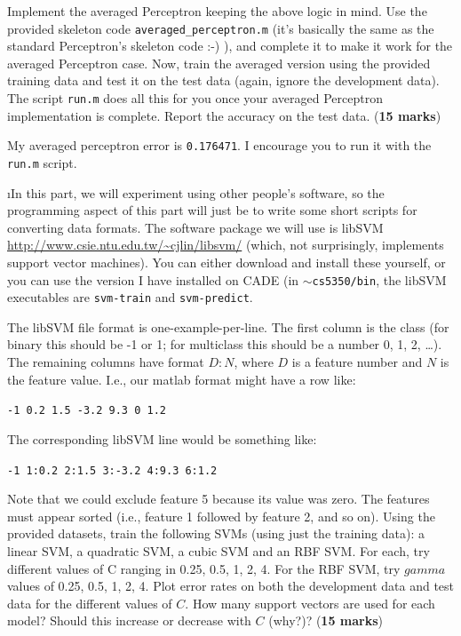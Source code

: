 \documentclass[fleqn]{article}
\begin{document}
Implement the averaged Perceptron keeping the above logic in mind. Use the
provided skeleton code \texttt{averaged\_perceptron.m} (it's basically 
the same as the standard Perceptron's skeleton
code :-) ), and complete it to make it work for the averaged 
Perceptron case. Now, train the averaged version using the provided training 
data and test it on the test data (again, ignore the development data). 
The script \texttt{run.m} does all this for you once your averaged Perceptron 
implementation is complete. Report the accuracy on the test data. (\textbf{15 marks})

\begin{solution}
My averaged perceptron error is \texttt{0.176471}. I encourage you to run it with the \texttt{run.m} script.
\end{solution}

\i In this part, we will experiment using other people's software, 
so the programming aspect of this part will just be to write some 
short scripts for converting data formats. The software package we 
will use is libSVM \url{http://www.csie.ntu.edu.tw/~cjlin/libsvm/} 
(which, not surprisingly, implements support vector machines). You 
can either download and install these yourself, or you can use the 
version I have installed on CADE (in \texttt{$\sim$cs5350/bin}, the 
libSVM executables are \texttt{svm-train} and \texttt{svm-predict}.

The libSVM file format is one-example-per-line. The first column is 
the class (for binary this should be -1 or 1; for multiclass this should 
be a number 0, 1, 2, \ldots). The remaining columns have format $D:N$, where
$D$ is a feature number and $N$ is the feature value. I.e., our matlab format 
might have a row like:

\begin{center}
 \texttt{-1 0.2 1.5 -3.2 9.3 0 1.2}
\end{center}

The corresponding libSVM line would be something like:

\begin{center}
 \texttt{-1 1:0.2 2:1.5 3:-3.2 4:9.3 6:1.2}
\end{center}

Note that we could exclude feature 5 because its value was zero. The features 
must appear sorted (i.e., feature 1 followed by feature 2, and so on). Using 
the provided datasets, train the following SVMs (using just the training data): 
a linear SVM, a quadratic SVM, a cubic SVM and an RBF SVM. For each, try different 
values of C ranging in 0.25, 0.5, 1, 2, 4. For the RBF SVM, try $gamma$ values 
of 0.25, 0.5, 1, 2, 4. Plot error rates on both the development data and test 
data for the different values of $C$. How many support vectors are used for each 
model? Should this increase or decrease with $C$ (why?)? (\textbf{15 marks})
\ene
\end{document}
